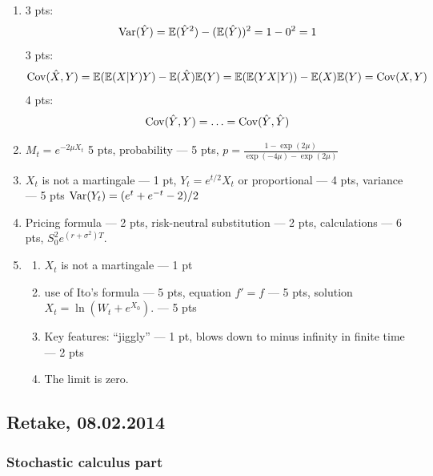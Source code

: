 \documentclass[pdftex,12pt,a4paper]{article}
\begin{document}
\begin{enumerate}
\item 3 pts:
\[
\operatorname{Var}(\hat{Y})=\mathbb{E}(\hat{Y}^2)-(\mathbb{E}(\hat{Y}))^2=1-0^2=1
\]
3 pts: 
\[
\operatorname{Cov}(\hat{X},Y)=\mathbb{E}(\mathbb{E}(X|Y)Y)-\mathbb{E}(\hat{X})\mathbb{E}(Y)=\mathbb{E}(\mathbb{E}(YX|Y))-\mathbb{E}(X)\mathbb{E}(Y)=\operatorname{Cov}(X,Y)
\]
4 pts:
\[
\operatorname{Cov}(\hat{Y},Y)=\ldots=\operatorname{Cov}(\hat{Y},\hat{Y})
\]

\item $M_t=e^{-2\mu X_t}$ 5 pts, probability --- 5 pts, $p=\frac{1-\exp(2\mu)}{\exp(-4\mu)-\exp(2\mu)}$

\item $X_t$ is not a martingale --- 1 pt, $Y_t=e^{t/2}X_t$ or proportional --- 4 pts, variance --- 5 pts $\operatorname{Var}(Y_t)=(e^t+e^{-t}-2)/2$

\item Pricing formula --- 2 pts, risk-neutral substitution --- 2 pts, calculations --- 6 pts, $S_0^2 e^{(r+\sigma^2)T}$.

\item
\begin{enumerate}
\item  $X_t$ is not a martingale --- 1 pt
\item use of Ito's formula --- 5 pts, equation $f'=f$ --- 5 pts, solution $X_t=\ln(W_t+e^{X_0})$. --- 5 pts
\item Key features: ``jiggly'' ---  1 pt, blows down to minus infinity in finite time --- 2 pts 
\item The limit is zero.
\end{enumerate}

\end{enumerate}

\subsection{Retake, 08.02.2014}

\subsubsection*{Stochastic calculus part}
\end{document}
